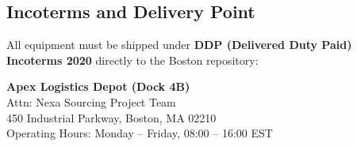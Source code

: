 \subsection{Incoterms and Delivery Point}
All equipment must be shipped under \textbf{DDP (Delivered Duty Paid) Incoterms 2020} directly to the Boston repository:
\vspace{0.2cm}
\begin{tcolorbox}[rfqbox, colback=white, left=8pt, right=8pt, top=8pt, bottom=8pt]
  \sffamily\small
  \textcolor{primary}{\bfseries Apex Logistics Depot (Dock 4B)} \\
  Attn: Nexa Sourcing Project Team \\
  450 Industrial Parkway, Boston, MA 02210 \\
  \textcolor{textmute}{Operating Hours: Monday -- Friday, 08:00 -- 16:00 EST}
\end{tcolorbox}
